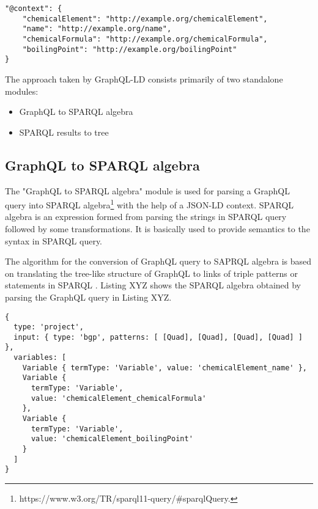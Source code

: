 \begin{minipage}{\linewidth}
\begin{lstlisting}[label=listing:listing7, caption={JSON-LD context}]
"@context": {
	"chemicalElement": "http://example.org/chemicalElement",
	"name": "http://example.org/name",
	"chemicalFormula": "http://example.org/chemicalFormula",
	"boilingPoint": "http://example.org/boilingPoint"
}
\end{lstlisting}
\end{minipage}

The approach taken by GraphQL-LD consists primarily of two standalone modules:
\begin{itemize}
	\item GraphQL to SPARQL algebra
	\item SPARQL results to tree
\end{itemize}


\subsection{GraphQL to SPARQL algebra}

The "GraphQL to SPARQL algebra" module is used for parsing a GraphQL query into SPARQL algebra\footnote{https://www.w3.org/TR/sparql11-query/\#sparqlQuery.} with the help of a JSON-LD context. SPARQL algebra is an expression formed from parsing the strings in SPARQL query followed by some transformations. It is basically used to provide semantics to the syntax in SPARQL query.

The algorithm for the conversion of GraphQL query to SAPRQL algebra is based on translating the tree-like structure of GraphQL to links of triple patterns or statements  in SPARQL \cite{Taelman2018}. Listing XYZ shows the SPARQL algebra obtained by parsing the GraphQL query in Listing XYZ.

\begin{minipage}{\linewidth}
\begin{lstlisting}[label=listing:listing8, caption={Generated SPARQL Algebra}]
{
  type: 'project',
  input: { type: 'bgp', patterns: [ [Quad], [Quad], [Quad], [Quad] ] },
  variables: [
    Variable { termType: 'Variable', value: 'chemicalElement_name' },
    Variable {
      termType: 'Variable',
      value: 'chemicalElement_chemicalFormula'
    },
    Variable {
      termType: 'Variable',
      value: 'chemicalElement_boilingPoint'
    }
  ]
}

\end{lstlisting}
\end{minipage}

